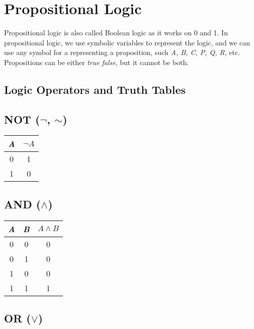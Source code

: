 \newpage
\section{Propositional Logic}

Propositional logic is also called Boolean logic as 
it works on 0 and 1. In propositional logic, we use symbolic variables to represent the 
logic, and we can use any symbol for a representing a proposition, such 
\emph{A, B, C, P, Q, R}, etc. Propositions can be either \emph{true} \emph{false}, but it cannot be both.

\subsection{Logic Operators and Truth Tables}
\smallskip
\begin{multicols}{2}

	\subsection*{NOT (\(\neg\), \(\sim\))}

	\begin{tabular}{cc}
		\toprule
		\emph{A} & \(\neg A\) \\
		\midrule
		0   & 1        \\
		1   & 0        \\
		\bottomrule
	\end{tabular}

	\vspace{1em}

	\subsection*{AND (\(\land\))}

	\begin{tabular}{ccc}
		\toprule
		\emph{A} & \emph{B} & \(A \land B\) \\
		\midrule
		0   & 0   & 0           \\
		0   & 1   & 0           \\
		1   & 0   & 0           \\
		1   & 1   & 1           \\
		\bottomrule
	\end{tabular}

	\vspace{1em}

	\subsection*{OR (\(\lor\))}


\end{multicols}
